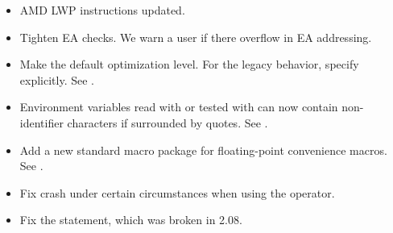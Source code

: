 \begin{itemize}
    \item{AMD LWP instructions updated.}
    \item{Tighten EA checks. We warn a user if there overflow in EA addressing.}
    \item{Make  the default optimization level. For the legacy
        behavior, specify  explicitly. See .}
    \item{Environment variables read with \code{\%!} or tested with 
        can now contain non-identifier characters if surrounded by quotes.
        See .}
    \item{Add a new standard macro package  for floating-point
        convenience macros. See .}
\end{itemize}


\begin{itemize}
    \item{Fix crash under certain circumstances when using
        the \code{\%+} operator.}
\end{itemize}


\begin{itemize}
    \item{Fix the  statement, which was broken in 2.08.}
\end{itemize}


